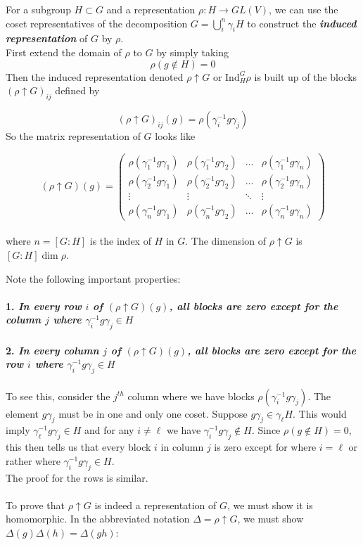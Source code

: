 \documentclass[9 pt]{report}
\begin{document}
\begin{tcolorbox}
	For a subgroup $H\subset G$ and a representation $\rho:H\to GL(V)$, we can use the coset representatives of the decomposition $G=\bigcup_i^n \gamma_iH$ to construct the \textbf{\emph{induced representation}} of $G$ by $\rho$. 
	\\
	First extend the domain of $\rho$ to $G$ by simply taking
	$$ \rho(g\notin H) = 0 $$
	Then the induced representation denoted $\rho\uparrow G$ or $\text{Ind}_H^G \rho$ is built up of the blocks $(\rho\uparrow G)_{ij}$ defined by
	
	$$ (\rho\uparrow G)_{ij}(g) = 
			\rho(\gamma_i^{-1}g \gamma_j)
	 $$
	 So the matrix representation of $G$ looks like
	 
	 $$ (\rho\uparrow G)(g) = 
	 \begin{pmatrix}
	 	\rho(\gamma_1^{-1} g \gamma_1) & \rho(\gamma_1^{-1} g \gamma_2) & \dots & \rho(\gamma_1^{-1} g \gamma_n) \\
	 	\rho(\gamma_2^{-1} g \gamma_1) & \rho(\gamma_2^{-1} g \gamma_2) & \dots & \rho(\gamma_2^{-1} g \gamma_n)\\
	 	\vdots & \vdots & \ddots & \vdots \\
	 	\rho(\gamma_n^{-1} g \gamma_1) & \rho(\gamma_n^{-1} g \gamma_2) & \dots & \rho(\gamma_n^{-1} g \gamma_n)
	 \end{pmatrix} $$
	 \\
	 where $n = [G:H]$ is the index of $H$ in $G$. The dimension of $\rho\uparrow G$ is $[G:H]\dim\rho $.
\end{tcolorbox}
Note the following important properties:
\\
\\
\textbf{1. \emph{In every row $i$ of $(\rho\uparrow G)(g)$, all blocks are zero except for the column $j$ where $\gamma_i^{-1}g\gamma_j\in H$}}
\\
\\
\textbf{2. \emph{In every column $j$ of $(\rho\uparrow G)(g)$, all blocks are zero except for the row $i$ where $\gamma_i^{-1}g\gamma_j\in H$}}
\\
\\
To see this, consider the $j^{th}$ column where we have blocks $\rho(\gamma_i^{-1}g\gamma_j)$. The element $g\gamma_j$ must be in one and only one coset. Suppose $g\gamma_j \in \gamma_\ell H$. This would imply $\gamma_\ell^{-1}g\gamma_j \in H$ and for any $i\neq\ell$ we have $\gamma^{-1}_ig\gamma_j\notin H$. Since $\rho(g\notin H)=0$, this then tells us that every block $i$ in column $j$ is zero except for where $i=\ell$ or rather where  $\gamma_i^{-1}g\gamma_j\in H$.
\\
The proof for the rows is similar. 
\\
\\
To prove that $\rho\uparrow G$ is indeed a representation of $G$, we must show it is homomorphic. In the abbreviated notation $\Delta=\rho\uparrow G$, we must show $\Delta(g)\Delta(h) = \Delta(gh)$:
\end{document}
